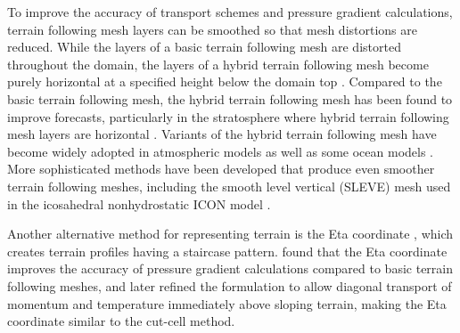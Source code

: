 To improve the accuracy of transport schemes and pressure gradient calculations, terrain following mesh layers can be smoothed so that mesh distortions are reduced.
While the layers of a basic terrain following mesh are distorted throughout the domain, the layers of a hybrid terrain following mesh become purely horizontal at a specified height below the domain top \citep{simmons-burridge1981}.
Compared to the basic terrain following mesh, the hybrid terrain following mesh has been found to improve forecasts, particularly in the stratosphere where hybrid terrain following mesh layers are horizontal \citep{eckermann2014}.
Variants of the hybrid terrain following mesh have become widely adopted in atmospheric models \citep{davies2005,donner2011} as well as some ocean models \citep{burchard-petersen1997,halliwell2004}.
More sophisticated methods have been developed that produce even smoother terrain following meshes, including the smooth level vertical (SLEVE) mesh \citep{schaer2002,leuenberger2010} used in the icosahedral nonhydrostatic ICON model \citep{zaengl2015}.

Another alternative method for representing terrain is the Eta coordinate \citep{mesinger1988}, which creates terrain profiles having a staircase pattern.
\citet{mesinger1988} found that the Eta coordinate improves the accuracy of pressure gradient calculations compared to basic terrain following meshes, and \citet{mesinger2012} later refined the formulation to allow diagonal transport of momentum and temperature immediately above sloping terrain, making the Eta coordinate similar to the cut-cell method.






